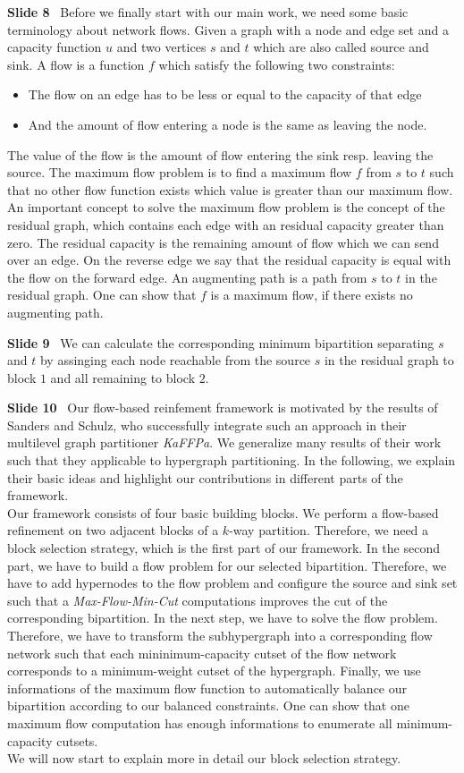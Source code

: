 \documentclass[11pt]{llncs}
\newcommand{\fakepar}[1]{\medskip\par\textbf{#1}\ }
\begin{document}
\fakepar{Slide 8} Before we finally start with our main work, we need some basic terminology about
network flows. Given a graph with a node and edge set and a capacity function $u$ and two vertices
$s$ and $t$ which are also called source and sink. A flow is a function $f$ which satisfy 
the following two constraints:
\begin{itemize}
\item The flow on an edge has to be less or equal to the capacity of that edge
\item And the amount of flow entering a node is the same as leaving the node.
\end{itemize}
The value of the flow is the amount of flow entering the sink resp. leaving the source.
The maximum flow problem is to find a maximum flow $f$ from $s$ to $t$ such that no other flow
function exists which value is greater than our maximum flow. An important concept to solve
the maximum flow problem is the concept of the residual graph, which contains each
edge with an residual capacity greater than zero. The residual capacity is the remaining amount
of flow which we can send over an edge. On the reverse edge we say that the residual capacity
is equal with the flow on the forward edge. An augmenting path is a path from $s$ to $t$
in the residual graph. One can show that $f$ is a maximum flow, if there exists no augmenting path.

\fakepar{Slide 9} We can calculate the corresponding minimum bipartition separating $s$ and $t$
by assinging each node reachable from the source $s$ in the residual graph to block $1$ and all 
remaining to block $2$.

\fakepar{Slide 10} Our flow-based reinfement framework is motivated by the results of
Sanders and Schulz, who successfully integrate such an approach in their multilevel 
graph partitioner \emph{KaFFPa}. We generalize many results of their work such that they
applicable to hypergraph partitioning. In the following, we explain their basic ideas and
highlight our contributions in different parts of the framework.\\
Our framework consists of four basic building blocks. We perform a flow-based refinement on
two adjacent blocks of a $k$-way partition. Therefore, we need a block selection strategy, which is
the first part of our framework. In the second part, we have to build a flow problem for our
selected bipartition. Therefore, we have to add hypernodes to the flow problem and configure the source
and sink set such that a \emph{Max-Flow-Min-Cut} computations improves the cut of the corresponding
bipartition. In the next step, we have to solve the flow problem. Therefore, we have to transform 
the subhypergraph into a corresponding flow network such that each mininimum-capacity cutset 
of the flow network corresponds to a minimum-weight cutset of the hypergraph. Finally, we use
informations of the maximum flow function to automatically balance our bipartition according
to our balanced constraints. One can show that one maximum flow computation has enough informations
to enumerate all minimum-capacity cutsets. \\
We will now start to explain more in detail our block selection strategy.
\end{document}
